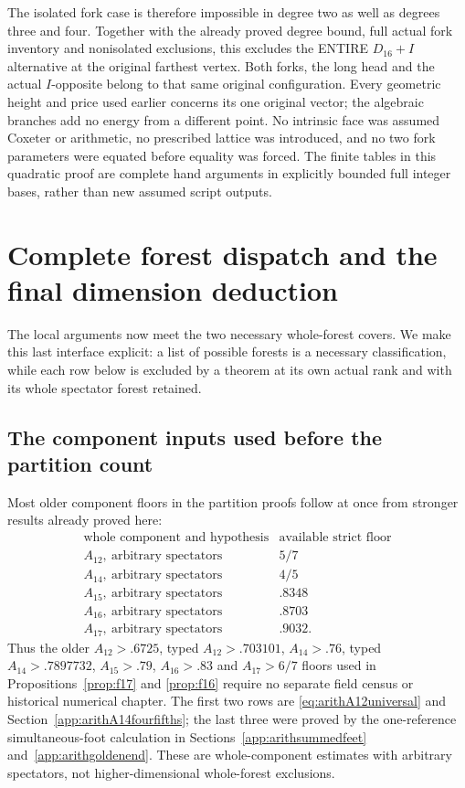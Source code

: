 \documentclass[11pt]{article}
\begin{document}
The isolated fork case is therefore
impossible in degree two as well
as degrees three and four.
Together with the already proved
degree bound, full actual fork
inventory and nonisolated exclusions,
this excludes the ENTIRE
\(D_{16}+I\) alternative at the
original farthest vertex.
Both forks, the long head and
the actual \(I\)-opposite belong
to that same original configuration.
Every geometric height and price
used earlier concerns its one
original vector; the algebraic
branches add no energy from a
different point.
No intrinsic face was assumed
Coxeter or arithmetic, no prescribed
lattice was introduced, and no
two fork parameters were equated
before equality was forced.
The finite tables in this quadratic
proof are complete hand arguments
in explicitly bounded full integer
bases, rather than new assumed
script outputs.

\section{Complete forest dispatch and the final dimension deduction}
\label{app:arithcoverclosure}

The local arguments now meet the two
necessary whole-forest covers.
We make this last interface explicit:
a list of possible forests is a
necessary classification, while each
row below is excluded by a theorem
at its own actual rank and with its
whole spectator forest retained.

\subsection{The component inputs used before the partition count}
\label{app:arithcoverinputs}

Most older component floors in the
partition proofs follow at once
from stronger results already proved
here:
\[
\begin{array}{c|c}
 \text{whole component and hypothesis}&\text{available strict floor}\\ \hline
 A_{12},\ \text{arbitrary spectators}&5/7\\
 A_{14},\ \text{arbitrary spectators}&4/5\\
 A_{15},\ \text{arbitrary spectators}&.8348\\
 A_{16},\ \text{arbitrary spectators}&.8703\\
 A_{17},\ \text{arbitrary spectators}&.9032 .
\end{array}
\]
Thus the older \(A_{12}>.6725\),
typed \(A_{12}>.703101\), \(A_{14}>.76\),
typed \(A_{14}>.7897732\),
\(A_{15}>.79\), \(A_{16}>.83\) and
\(A_{17}>6/7\) floors used in
Propositions~\ref{prop:f17} and
\ref{prop:f16} require no separate
field census or historical numerical
chapter.
The first two rows are
\eqref{eq:arithA12universal} and
Section~\ref{app:arithA14fourfifths};
the last three were proved by the
one-reference simultaneous-foot
calculation in
Sections~\ref{app:arithsummedfeet}
and~\ref{app:arithgoldenend}.
These are whole-component estimates
with arbitrary spectators, not
higher-dimensional whole-forest
exclusions.
\end{document}
